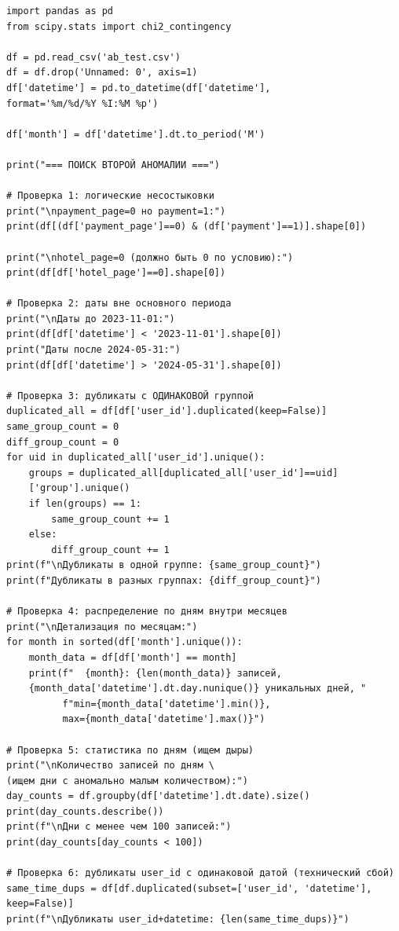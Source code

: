\documentclass[pract]{SCWorks}
\begin{document}
\begin{verbatim}
import pandas as pd
from scipy.stats import chi2_contingency

df = pd.read_csv('ab_test.csv')
df = df.drop('Unnamed: 0', axis=1)
df['datetime'] = pd.to_datetime(df['datetime'], 
format='%m/%d/%Y %I:%M %p')

df['month'] = df['datetime'].dt.to_period('M')

print("=== ПОИСК ВТОРОЙ АНОМАЛИИ ===")

# Проверка 1: логические несостыковки
print("\npayment_page=0 но payment=1:")
print(df[(df['payment_page']==0) & (df['payment']==1)].shape[0])

print("\nhotel_page=0 (должно быть 0 по условию):")
print(df[df['hotel_page']==0].shape[0])

# Проверка 2: даты вне основного периода
print("\nДаты до 2023-11-01:")
print(df[df['datetime'] < '2023-11-01'].shape[0])
print("Даты после 2024-05-31:")
print(df[df['datetime'] > '2024-05-31'].shape[0])

# Проверка 3: дубликаты с ОДИНАКОВОЙ группой
duplicated_all = df[df['user_id'].duplicated(keep=False)]
same_group_count = 0
diff_group_count = 0
for uid in duplicated_all['user_id'].unique():
    groups = duplicated_all[duplicated_all['user_id']==uid]
    ['group'].unique()
    if len(groups) == 1:
        same_group_count += 1
    else:
        diff_group_count += 1
print(f"\nДубликаты в одной группе: {same_group_count}")
print(f"Дубликаты в разных группах: {diff_group_count}")

# Проверка 4: распределение по дням внутри месяцев
print("\nДетализация по месяцам:")
for month in sorted(df['month'].unique()):
    month_data = df[df['month'] == month]
    print(f"  {month}: {len(month_data)} записей, 
    {month_data['datetime'].dt.day.nunique()} уникальных дней, "
          f"min={month_data['datetime'].min()}, 
          max={month_data['datetime'].max()}")

# Проверка 5: статистика по дням (ищем дыры)
print("\nКоличество записей по дням \
(ищем дни с аномально малым количеством):")
day_counts = df.groupby(df['datetime'].dt.date).size()
print(day_counts.describe())
print(f"\nДни с менее чем 100 записей:")
print(day_counts[day_counts < 100])

# Проверка 6: дубликаты user_id с одинаковой датой (технический сбой)
same_time_dups = df[df.duplicated(subset=['user_id', 'datetime'], 
keep=False)]
print(f"\nДубликаты user_id+datetime: {len(same_time_dups)}")
\end{verbatim}
\end{document}
